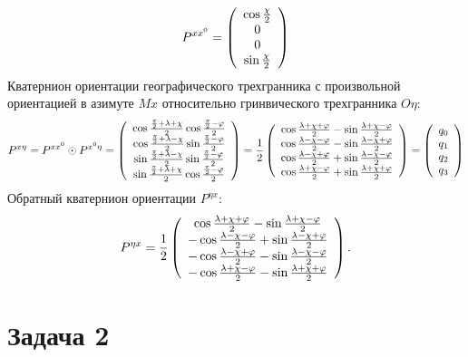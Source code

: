 \documentclass[a4paper,14pt]{article}
\theoremstyle{plain} %
\theoremstyle{definition} %
\theoremstyle{remark} %
\begin{document}
{\begin{eqnarray*}
    P^{xx^0}= \left( \begin{array}{c}
            \cos\frac{\chi}{2} \cr
            0 \cr
            0 \cr
            \sin\frac{\chi}{2}
        \end{array} \right)
\end{eqnarray*}
Кватернион ориентации географического трехгранника с произвольной
ориентацией в азимуте $Mx$ относительно гринвического трехгранника $O\eta$:
{\small\begin{eqnarray*}
    P^{x\eta}=P^{xx^0} \odot P^{x^0\eta}=
    \left(
    \begin{array}{c}
            \cos\frac{\frac{\pi}{2}+\lambda + \chi}{2}\cos \frac{\frac{\pi}{2}-\varphi}{2}\cr
            \cos\frac{\frac{\pi}{2}+\lambda - \chi}{2}\sin\frac{\frac{\pi}{2}-\varphi}{2}\cr
            \sin\frac{\frac{\pi}{2}+\lambda - \chi}{2}\sin \frac{\frac{\pi}{2}-\varphi}{2}\cr
            \sin\frac{\frac{\pi}{2}+\lambda + \chi}{2}\cos \frac{\frac{\pi}{2}-\varphi}{2}
        \end{array}
    \right)
    =
    \frac{1}{2}
    \left(
    \begin{array}{c}
            \cos\frac{\lambda+\chi+\varphi}{2}- \sin\frac{\lambda+\chi-\varphi}{2}\cr
            \cos\frac{\lambda-\chi-\varphi}{2}- \sin\frac{\lambda-\chi+\varphi}{2}\cr
            \cos\frac{\lambda-\chi+\varphi}{2}+ \sin\frac{\lambda-\chi-\varphi}{2}\cr
            \cos\frac{\lambda+\chi-\varphi}{2}+ \sin\frac{\lambda+\chi+\varphi}{2}
        \end{array}
    \right)=
    \left(
    \begin{array}{c}
            q_0\cr
            q_1\cr
            q_2\cr
            q_3
        \end{array}
    \right)
\end{eqnarray*}
}
Обратный кватернион ориентации $P^{\eta x}$:
\begin{eqnarray*}
    P^{\eta x} =\frac{1}{2}
    \left(
    \begin{array}{c}
            \cos\frac{\lambda+\chi+\varphi}{2}- \sin\frac{\lambda+\chi-\varphi}{2}\cr
            -\cos\frac{\lambda-\chi-\varphi}{2}+ \sin\frac{\lambda-\chi+\varphi}{2}\cr
            -\cos\frac{\lambda-\chi+\varphi}{2}- \sin\frac{\lambda-\chi-\varphi}{2}\cr
            -\cos\frac{\lambda+\chi-\varphi}{2}- \sin\frac{\lambda+\chi+\varphi}{2}
        \end{array}
    \right).
\end{eqnarray*}
\newpage
\section{Задача 2}
}
\end{document}
